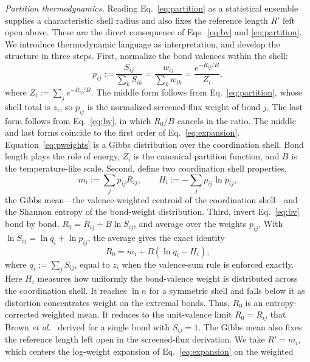 \documentclass[aps,prmaterials,twocolumn,10pt,superscriptaddress,floatfix]{revtex4-2}
\newcommand{\runinsec}[1]{\medskip\emph{#1}}
\begin{document}
\runinsec{Partition thermodynamics.} Reading
Eq.~\eqref{eq:partition} as a statistical ensemble supplies a characteristic
shell radius and also fixes the reference length $R'$ left open above.
These are the direct consequence of Eqs.~\eqref{eq:bv} and
\eqref{eq:partition}.  We introduce thermodynamic language as interpretation,
and develop the structure in three
steps.  First, normalize the bond valences within the shell:
\begin{equation}\label{eq:pweights}
p_{ij}:=\frac{S_{ij}}{\sum_k S_{ik}}
=\frac{w_{ij}}{\sum_k w_{ik}}
=\frac{e^{-R_{ij}/B}}{Z_i},
\end{equation}
where $Z_i:=\sum_j e^{-R_{ij}/B}$.  The middle form follows from
Eq.~\eqref{eq:partition}, whose shell total is $z_i$, so $p_{ij}$ is
the normalized screened-flux weight of bond $j$.  The last form
follows from Eq.~\eqref{eq:bv}, in which $R_0/B$ cancels in the
ratio.  The middle and last forms coincide to the first order of
Eq.~\eqref{eq:expansion}.  Equation~\eqref{eq:pweights} is a Gibbs distribution over the
coordination shell.  Bond length plays the role of energy, $Z_i$ is
the canonical partition function, and $B$ is the temperature-like
scale. Second, define two coordination shell properties,
\begin{equation}\label{eq:mean_entropy}
m_i:=\sum_j p_{ij}R_{ij},
\qquad
H_i:=-\sum_j p_{ij}\ln p_{ij},
\end{equation}
the Gibbs mean---the valence-weighted centroid of the
coordination shell---and the Shannon entropy of the bond-weight
distribution.  Third, invert Eq.~\eqref{eq:bv} bond by bond,
$R_0=R_{ij}+B\ln S_{ij}$, and average over the weights $p_{ij}$.
With $\ln S_{ij}=\ln q_i+\ln p_{ij}$, the average gives the exact
identity
\begin{equation}\label{eq:R0_identity}
R_0 = m_i + B(\ln q_i - H_i),
\end{equation}
where $q_i:=\sum_j S_{ij}$, equal to $z_i$ when the valence-sum rule
is enforced exactly.  Here $H_i$ measures how uniformly the
bond-valence weight is distributed across the coordination shell.  It
reaches $\ln n$ for a symmetric shell and falls below it as distortion
concentrates weight on the extremal bonds.
Thus, $R_0$ is an entropy-corrected weighted
mean. It reduces to the unit-valence limit $R_0=R_{ij}$ that Brown
\emph{et al.}\ \cite{Brown2016} derived for a single bond with $S_{ij}=1$.
The Gibbs mean also fixes the reference length left open in
the screened-flux derivation. We take $R'=m_i$, which centers the
log-weight expansion of Eq.~\eqref{eq:expansion} on the weighted
\end{document}
